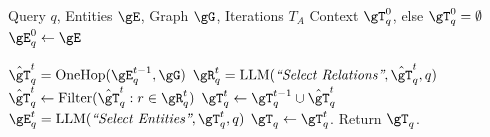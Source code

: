 \begin{algorithm}[t]
\centering
\caption{Agentic Retrieval.} \label{alg:agentic}
\begin{algorithmic}[1]
    Query  $q$, Entities $\gE$, Graph $\gG$, Iterations $T_A$
    Context $\gT_q^{0}$, else $\gT_q^{0} = \emptyset$
   \STATE $\gE_q^{0} \gets \gE$
   
   
    \STATE $\hat{\gT}_q^{t} =  \text{OneHop}(\gE_q^{t-1},\gG)$ \hfill{}
    \STATE $\gR_q^{t} = \text{LLM}(\textit{``Select Relations''}, \hat{\gT}_q^{t}, q)$ \hfill{}
    \STATE $\hat{\gT}_q^{t} \gets \text{Filter}(\hat{\gT}_q^{t}: r \in \gR_q^{t})$
    \STATE $\gT_q^{t} \gets \gT_q^{t-1} \cup \hat{\gT}_q^{t} $ \hfill{}
    \STATE $\gE_q^{t} = \text{LLM}(\textit{``Select Entities''}, \gT_q^{t}, q)$
    \hfill{}
         \hfill{}
    \ENDIF
   \ENDFOR
   \STATE  $\gT_q \gets  \gT_q^{t}$.
    Return $\gT_q$.
\end{algorithmic}
\end{algorithm}
